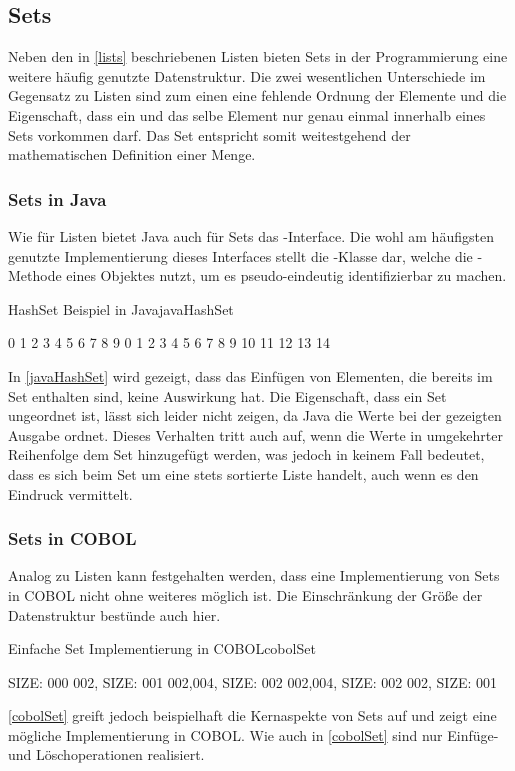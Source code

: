 \subsection{Sets}
Neben den in \autoref{lists} beschriebenen Listen bieten Sets in der Programmierung eine weitere häufig genutzte Datenstruktur. Die zwei wesentlichen Unterschiede im Gegensatz zu Listen sind zum einen eine fehlende Ordnung der Elemente und die Eigenschaft, dass ein und das selbe Element nur genau einmal innerhalb eines Sets vorkommen darf. Das Set entspricht somit weitestgehend der mathematischen Definition einer Menge.

\subsubsection*{Sets in Java}
Wie für Listen bietet Java auch für Sets das -Interface. Die wohl am häufigsten genutzte Implementierung dieses Interfaces stellt die -Klasse dar, welche die -Methode eines Objektes nutzt, um es pseudo-eindeutig identifizierbar zu machen.

\begin{codeWithCaption}{HashSet Beispiel in Java}{javaHashSet}
\begin{shellwindow}
0 1 2 3 4 5 6 7 8 9 
0 1 2 3 4 5 6 7 8 9 10 11 12 13 14 
\end{shellwindow}
\end{codeWithCaption}

In \autoref{javaHashSet} wird gezeigt, dass das Einfügen von Elementen, die bereits im Set enthalten sind, keine Auswirkung hat. Die Eigenschaft, dass ein Set ungeordnet ist, lässt sich leider nicht zeigen, da Java die Werte bei der gezeigten Ausgabe ordnet. Dieses Verhalten tritt auch auf, wenn die Werte in umgekehrter Reihenfolge dem Set hinzugefügt werden, was jedoch in keinem Fall bedeutet, dass es sich beim Set um eine stets sortierte Liste handelt, auch wenn es den Eindruck vermittelt.

\subsubsection*{Sets in COBOL}
Analog zu Listen kann festgehalten werden, dass eine Implementierung von Sets in COBOL nicht ohne weiteres möglich ist. Die Einschränkung der Größe der Datenstruktur bestünde auch hier. 

\begin{codeWithCaption}{Einfache Set Implementierung in COBOL}{cobolSet}
\begin{shellwindow}
 SIZE: 000
002, SIZE: 001
002,004, SIZE: 002
002,004, SIZE: 002
002, SIZE: 001
\end{shellwindow}
\end{codeWithCaption}

\autoref{cobolSet} greift jedoch beispielhaft die Kernaspekte von Sets auf und zeigt eine mögliche Implementierung in COBOL. Wie auch in \autoref{cobolSet} sind nur Einfüge- und Löschoperationen realisiert.